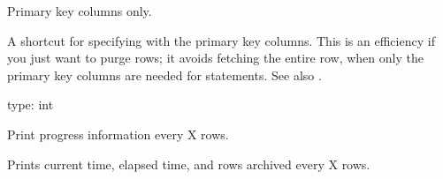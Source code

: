 \documentclass[letterpaper,10pt,english]{sphinxmanual}
\begin{document}

\begin{fulllineitems}
\label{\detokenize{mariadb-archiver:cmdoption-mariadb-archiver-primary-key-only}}
Primary key columns only.

A shortcut for specifying {\hyperref[\detokenize{mariadb-archiver:cmdoption-mariadb-archiver-columns}]{}} with the primary key columns.  This is
an efficiency if you just want to purge rows; it avoids fetching the entire row,
when only the primary key columns are needed for  statements.  See also
{\hyperref[\detokenize{mariadb-archiver:cmdoption-mariadb-archiver-purge}]{}}.

\end{fulllineitems}


\begin{fulllineitems}
\label{\detokenize{mariadb-archiver:cmdoption-mariadb-archiver-progress}}
type: int

Print progress information every X rows.

Prints current time, elapsed time, and rows archived every X rows.

\end{fulllineitems}
\end{document}
